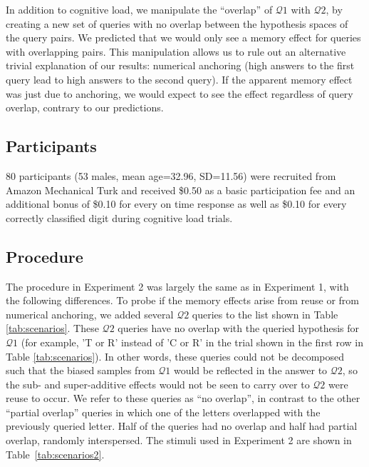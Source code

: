 In addition to cognitive load, we manipulate the ``overlap'' of $\mathcal{Q}1$ with $\mathcal{Q}2$, by creating a new set of queries with no overlap between the hypothesis spaces of the query pairs. We predicted that we would only see a memory effect for queries with overlapping pairs. This manipulation allows us to rule out an alternative trivial explanation of our results: numerical anchoring (high answers to the first query lead to high answers to the second query). If the apparent memory effect was just due to anchoring, we would expect to see the effect regardless of query overlap, contrary to our predictions.

\subsection{Participants}

80 participants (53 males, mean age=32.96, SD=11.56) were recruited from Amazon Mechanical Turk and received \$0.50 as a basic participation fee and an additional bonus of \$0.10 for every on time response as well as \$0.10 for every correctly classified digit during cognitive load trials.

\subsection{Procedure}

The procedure in Experiment 2 was largely the same as in Experiment 1, with the following differences. To probe if the memory effects arise from reuse or from numerical anchoring, we added several $\mathcal{Q}2$ queries to the list shown in Table \ref{tab:scenarios}. These $\mathcal{Q}2$ queries have no overlap with the queried hypothesis for $\mathcal{Q}1$ (for example, 'T or R' instead of 'C or R' in the trial shown in the first row in Table \ref{tab:scenarios}). In other words, these queries could not be decomposed such that the biased samples from $\mathcal{Q}1$ would be reflected in the answer to $\mathcal{Q}2$, so the sub- and super-additive effects would not be seen to carry over to $\mathcal{Q}2$ were reuse to occur. We refer to these queries as ``no overlap'', in contrast to the other ``partial overlap'' queries in which one of the letters overlapped with the previously queried letter. Half of the queries had no overlap and half had partial overlap, randomly interspersed. The stimuli used in Experiment 2 are shown in Table~\ref{tab:scenarios2}.

